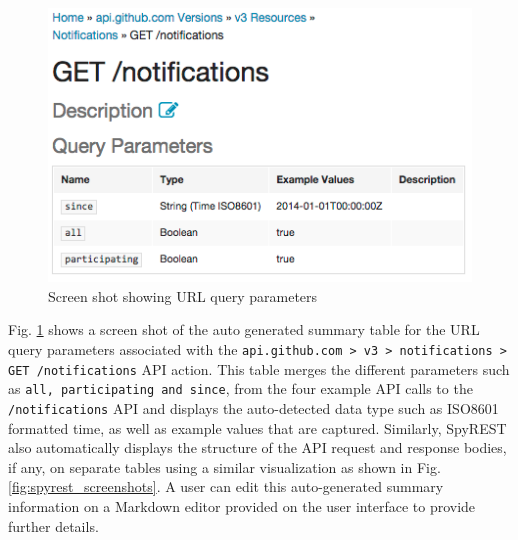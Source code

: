 \documentclass[conference]{IEEEtran}
\begin{document}
\begin{figure}[!tbh]
  \centering
  \includegraphics[width=\linewidth]{notifications_query.png}
  \caption{Screen shot showing URL query parameters}
  \label{fig:notifications_query}
\end{figure}

Fig. \ref{fig:notifications_query} shows a screen shot of the auto generated summary table for the URL query parameters associated with the \texttt{api.github.com > v3 > notifications > GET /notifications} API action. This table merges the different parameters such as \texttt{all, participating and since}, from the four example API calls to the \texttt{/notifications} API and displays the auto-detected data type such as ISO8601 formatted time, as well as example values that are captured. Similarly, SpyREST also automatically displays the structure of the API request and response bodies, if any, on separate tables using a similar visualization as shown in Fig. \ref{fig:spyrest_screenshots}. A user can edit this auto-generated summary information on a Markdown editor provided on the user interface to provide further details.
\end{document}
